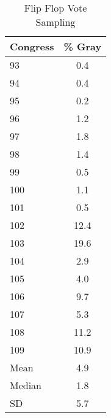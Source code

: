 \documentclass[12pt]{article}
\begin{document}
	\begin{table}[!htbp]
		\begin{center}
			\caption{Flip Flop Vote Sampling}
			\begin{tabular}[!hb]{lc}
				\hline
				Congress &  \% Gray  \\
				\hline
				
				93 & 0.4 \\ 
				94 & 0.4 \\ 
				95 & 0.2 \\ 
				96 & 1.2 \\ 
				97 & 1.8 \\ 
				98 & 1.4 \\ 
				99 & 0.5 \\ 
				100 & 1.1 \\ 
				101 & 0.5 \\ 
				102 & 12.4 \\ 
				103 & 19.6 \\ 
				104 & 2.9 \\ 
				105 & 4.0 \\ 
				106 & 9.7 \\ 
				107 & 5.3 \\ 
				108 & 11.2 \\ 
				109 & 10.9 \\ 
				\hline
				Mean & 4.9 \\
				Median & 1.8 \\
				SD & 5.7 \\
				\hline
			\end{tabular}
		\end{center}
	\end{table}
	
\end{document}
